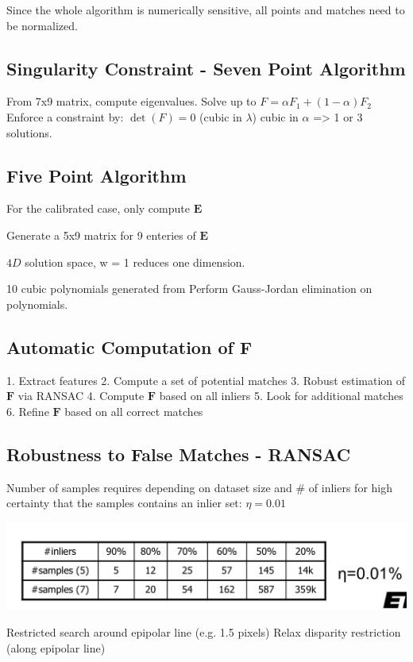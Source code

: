 Since the whole algorithm is numerically sensitive, all points and matches need to be normalized. 

\subsection{Singularity Constraint - Seven Point Algorithm}
From 7x9 matrix, compute eigenvalues.
Solve up to $F = \alpha F_1 + (1-\alpha) F_2$
Enforce a constraint by: $\det(F) = 0$ (cubic in $\lambda$)
cubic in $\alpha$ => 1 or 3 solutions.

\subsection{Five Point Algorithm}

For the calibrated case, only compute $\mathbf{E}$

Generate a 5x9 matrix for 9 enteries of $\mathbf{E}$

$4D$ solution space, w = 1 reduces one dimension.

10 cubic polynomials generated from 
Perform Gauss-Jordan elimination on polynomials.

\subsection{Automatic Computation of $\mathbf{F}$}
1. Extract features
2. Compute a set of potential matches
3. Robust estimation of $\mathbf{F}$ via RANSAC  
4. Compute $\mathbf{F}$ based on all inliers
5. Look for additional matches
6. Refine $\mathbf{F}$ based on all correct matches

\subsection{Robustness to False Matches - RANSAC}

Number of samples requires depending on dataset size and \# of inliers for high certainty that the samples contains an inlier set:
$\eta = 0.01$

\includegraphics[width=0.5\columnwidth]{cv_figures/ransac.png}

Restricted search around epipolar line (e.g. 1.5 pixels)
Relax disparity restriction (along epipolar line)


